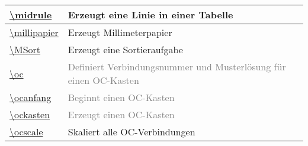 \documentclass[./main.tex]{subfiles}
\begin{document}
\begin{tabularx}{\linewidth}{|l|X|}
    \hyperlink{midrule}{\textbackslash{}midrule}&Erzeugt eine Linie in einer Tabelle\\\hline
    \hyperlink{millipapier}{\textbackslash{}millipapier}&Erzeugt Millimeterpapier\\\hline
    \hyperlink{MSort}{\textbackslash{}MSort}&Erzeugt eine Sortieraufgabe\\\hline
    \textcolor{gray}{\hyperlink{oc}{\textbackslash{}oc}}&\textcolor{gray}{Definiert Verbindungsnummer und Musterl\"osung f\"ur einen OC-Kasten}\\\hline
    \textcolor{gray}{\hyperlink{ocanfang}{\textbackslash{}ocanfang}}&\textcolor{gray}{Beginnt einen OC-Kasten}\\\hline
    \textcolor{gray}{\hyperlink{ockasten}{\textbackslash{}ockasten}}&\textcolor{gray}{Erzeugt einen OC-Kasten}\\\hline
    \hyperlink{ocscale}{\textbackslash{}ocscale}&Skaliert alle OC-Verbindungen\\\hline
\end{tabularx}
\end{document}

